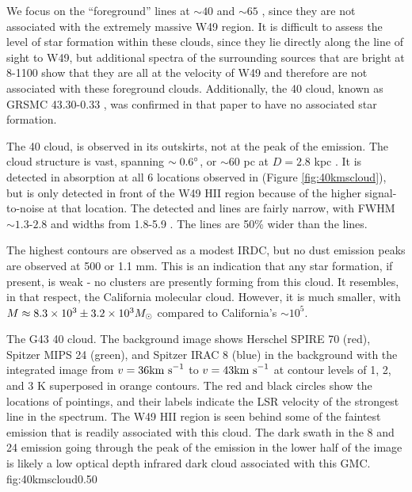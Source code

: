 We focus on the ``foreground'' lines at $\sim40$ \kms and $\sim65$ \kms, since
they are not associated with the extremely massive W49 region.  It is difficult
to assess the level of star formation within these clouds, since they lie
directly along the line of sight to W49, but additional \formaldehyde spectra
of the surrounding sources that are bright at 8-1100 \um show that they are all
at the velocity of W49 and therefore are not associated with these foreground
clouds.  Additionally, the 40 \kms cloud, known as GRSMC 43.30-0.33
\citep{Simon2001a}, was confirmed in that paper to have no associated star
formation.

The 40 \kms cloud, is observed in
its outskirts, not at the peak of the \thirteenco emission.  The cloud
structure is vast, spanning $\sim0.6^{\circ}$, or $\sim60$ pc at $D=2.8$ kpc
\citep{Roman-Duval2009a}.  It is detected in \oneone absorption at all 6
locations observed in \formaldehyde (Figure \ref{fig:40kmscloud}), but \twotwo
is only detected in front of the W49 HII region because of the higher
signal-to-noise at that location.  The detected \thirteenco and \formaldehyde
lines are fairly narrow, with \formaldehyde FWHM $\sim1.3$-$2.8$ \kms and
\thirteenco widths from 1.8-5.9 \kms.  The \thirteenco lines are 50\% wider
than the \formaldehyde lines.

The highest \thirteenco contours are observed as a modest IRDC, but no dust
emission peaks are observed at 500 \um or 1.1 mm.  This is an indication that
any star formation, if present, is weak - no clusters are presently forming
from this cloud.   It resembles, in that respect, the California molecular
cloud.  However, it is much smaller, with $M\approx8.3\times10^{3}\pm3.2\times10^{3} M_{\odot}$
compared to California's $\sim10^5$.

{The G43 40 \kms cloud.  The background image shows Herschel SPIRE 70 \um (red),
Spitzer MIPS 24 \um (green), and Spitzer IRAC 8 \um (blue) in the background with
the \thirteenco integrated image from $v=36 \textrm{km~s}^{-1}$ to $v=43 \textrm{km~s}^{-1}$ at contour levels of
1, 2, and 3 K superposed in orange contours.  The red and black circles
show the locations of \formaldehyde pointings, and their labels indicate the LSR velocity
of the strongest line in the spectrum.  The W49 HII region is seen
behind some of the faintest \thirteenco emission that is readily associated
with this cloud.  The dark swath in the 8 and 24 \um emission going through the
peak of the \thirteenco emission in the lower half of the image is likely a low
optical depth infrared dark cloud associated with this GMC.}
{fig:40kmscloud}{0.5}{0}

